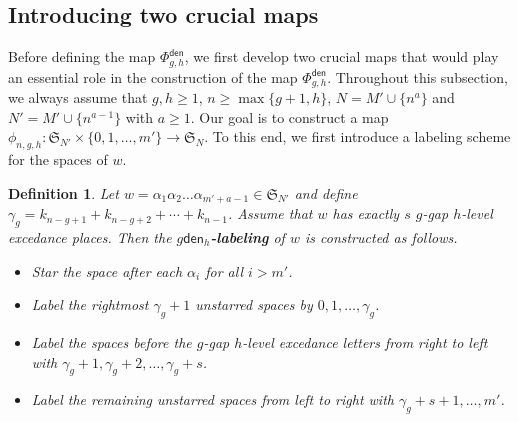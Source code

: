 \documentclass[12pt]{article}
\numberwithin{equation}{section}
\theoremstyle{plain}
\newtheorem{definition}[theorem]{Definition}
\def\den{\mathsf{den}}
\begin{document}
 \subsection{Introducing two crucial  maps}
 Before defining  the map $\Phi^{\den}_{g, h}$, we  first  develop  two crucial  maps that would play an essential role in the construction of the map $\Phi^{\den}_{g, h}$. 
Throughout  this subsection, we always assume that $g,h\geq 1$, $n\geq \max\{g+1, h\}$,    $N=M'\cup \{n^{a}\}$ and $N'=M'\cup \{n^{a-1}\}$ with $a\geq 1$.  
 Our goal is to construct  a map $\phi_{n,g,h}:\mathfrak{S}_{N'}\times  \{0,1,\ldots, m'\} \longrightarrow \mathfrak{S}_{N}$.  To this end, we  first introduce a   labeling scheme for  the spaces of  $w$. 
 \begin{definition}\label{def-den_r-label}
	Let $w=\alpha_1\alpha_2\ldots \alpha_{m'+a-1}\in \mathfrak{S}_{N'}$ and define  $\gamma_g=k_{n-g+1}+k_{n-g+2}+\cdots+k_{n-1}$.  Assume that $w$ has exactly $s$ $g$-gap $h$-level excedance places.  Then 
	the  {\bf  $g\den_{h}$-labeling} of $w$  is constructed as follows.
	\begin{itemize}
		\item  Star the space after each $\alpha_{i} $ for all $i>m'$.
		\item Label the  rightmost $\gamma_g+1$ unstarred spaces  by $0,1,\ldots, \gamma_g$. 
		\item Label the  spaces before the $g$-gap $h$-level excedance letters from right to left    with $\gamma_g+1,\gamma_g+2,\ldots, \gamma_g+s$. 
		\item  Label the remaining unstarred spaces  from left to right with $\gamma_g+s+1, \ldots, m'$.
	\end{itemize}	
\end{definition}
\end{document}
